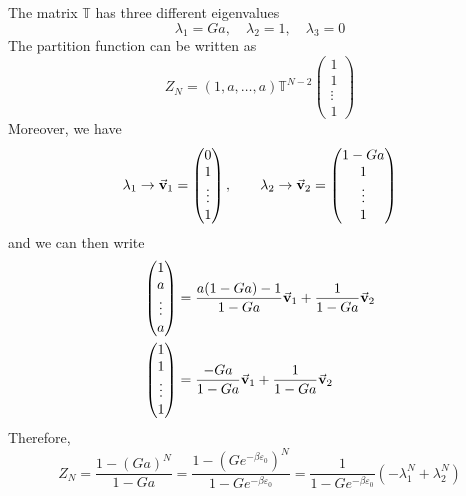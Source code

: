 \documentclass[../main/main.tex]{subfiles}
\begin{document}
The matrix \( \mathbb{T} \) has three different eigenvalues
\begin{equation}
  \lambda _1 = Ga, \quad \lambda _2 =1, \quad \lambda _3 = 0
\end{equation}
The partition function can be written as
\begin{equation}
  Z_N = (1,a, \dots,a) \mathbb{T}^{N-2} \begin{pmatrix}
  1 \\
  1 \\
  \vdots \\
  1
  \end{pmatrix}
\end{equation}
Moreover, we have 
\begin{equation*}
  \lambda _1 \rightarrow \va{v}_1 = \begin{pmatrix}
  0 \\
  1 \\
  \vdots \\
  1
  \end{pmatrix},
  \qquad
  \lambda _2 \rightarrow \va{v}_2 = \begin{pmatrix}
  1-Ga \\
  1 \\
  \vdots \\
  1
  \end{pmatrix}
\end{equation*}
and we can then write
\begin{subequations}
\begin{align*}
  \begin{pmatrix}
  1 \\
  a \\
  \vdots \\
  a
\end{pmatrix}  &= \frac{a(1-Ga)-1}{1-Ga} \va{v}_1 + \frac{1}{1-Ga}\va{v}_2 \\
\begin{pmatrix}
1 \\
1 \\
\vdots \\
1
\end{pmatrix}  &= \frac{-Ga}{1-Ga} \va{v}_1 + \frac{1}{1-Ga}\va{v}_2
\end{align*}
\end{subequations}
Therefore,
\begin{equation}
  Z_N = \frac{1-(Ga)^N}{1-Ga} = \frac{1-(G e^{-\beta \varepsilon _0} )^N}{1-G e^{-\beta \varepsilon _0} }
  = \frac{1}{1-G e^{-\beta \varepsilon _0} } (-\lambda _1^N + \lambda _2^N)
\end{equation}
\end{document}
